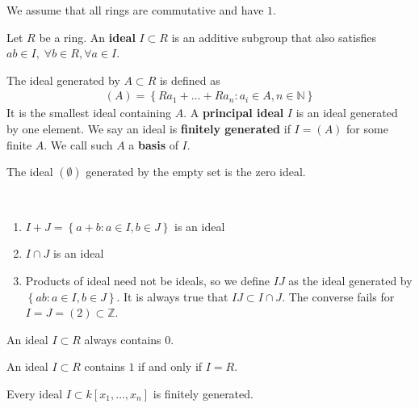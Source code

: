 \documentclass[a4paper, 11pt]{article}
\begin{document}
We assume that all rings are commutative and have \( 1 \).

\begin{defi}[Ideal]
  Let \( R \) be a ring. An \textbf{ideal} \( I \subset R \) is an additive subgroup that also satisfies 
  \( ab \in I, \; \forall b \in R, \forall a \in I \).
\end{defi}

\begin{defi}
  The ideal generated by \( A \subset R \) is defined as
  \begin{align*}
    (A) = \left\{ Ra_1 + \dots + Ra_n : a_i \in A, n \in \mathbb N \right\}
  \end{align*}
  It is the smallest ideal containing \( A \). A \textbf{principal ideal} \( I \) is an ideal generated by one element. We say an ideal is \textbf{finitely generated} if \( I = (A) \) for some finite \( A \). We call such \( A \) a \textbf{basis} of \( I \).
\end{defi}

\begin{remark}
  The ideal \( (\emptyset)  \) generated by the empty set is the zero ideal.
\end{remark}

\begin{remark}\(  \)
  \begin{enumerate}
    \item \( I + J = \left\{ a + b : a \in I, b \in J \right\} \) is an ideal
    \item \( I \cap J \) is an ideal
    \item Products of ideal need not be ideals, so we define \( IJ \) as the ideal generated by \( \left\{ ab : a \in I, b \in J \right\} \). It is always true that \( IJ \subset I \cap J \). The converse fails for \( I=J=(2) \subset \mathbb Z \).

  \end{enumerate}
\end{remark}

\begin{remark}
  An ideal \( I \subset R \) always contains \( 0 \).
\end{remark}

\begin{remark}
  An ideal \( I \subset R \) contains \( 1 \) if and only if \( I = R \). 
\end{remark}

\begin{thm}
  Every ideal \( I \subset k[x_1,\dots,x_n] \) is finitely generated.
\end{thm}
\end{document}
